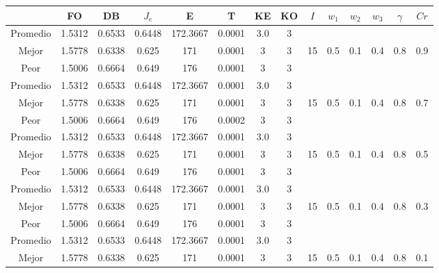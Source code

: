 \begin{table}[h!]
    \footnotesize
    \begin{center}
        \begin{tabular}{|c|c|c|c|c|c|c|c|c|c|c|c|c|c|}
        \hline
            & {\bf FO} & {\bf DB} & $J_e$ & {\bf E} & {\bf T} & {\bf KE} & {\bf KO} & $I$ & $w_1$ & $w_2$ & $w_3$ & $\gamma$ & $Cr$ \\
        \hline
        \hline
            Promedio  & 1.5312 & 0.6533 & 0.6448 & 172.3667 & 0.0001 & 3.0 & 3 &  &  &  &  &  & \\
            \cline{1-8}
            Mejor & 1.5778 & 0.6338  & 0.625 & 171 & 0.0001 & 3 & 3 & 15 & 0.5 & 0.1 & 0.4 & 0.8 & 0.9\\
            \cline{1-8}
            Peor & 1.5006 & 0.6664  & 0.649 & 176 & 0.0001 & 3 & 3 &  &  &  &  &  & \\
        \hline
        \hline
            Promedio  & 1.5312 & 0.6533 & 0.6448 & 172.3667 & 0.0001 & 3.0 & 3 &  &  &  &  &  & \\
            \cline{1-8}
            Mejor & 1.5778 & 0.6338  & 0.625 & 171 & 0.0001 & 3 & 3 & 15 & 0.5 & 0.1 & 0.4 & 0.8 & 0.7\\
            \cline{1-8}
            Peor & 1.5006 & 0.6664  & 0.649 & 176 & 0.0002 & 3 & 3 &  &  &  &  &  & \\
        \hline
        \hline
            Promedio  & 1.5312 & 0.6533 & 0.6448 & 172.3667 & 0.0001 & 3.0 & 3 &  &  &  &  &  & \\
            \cline{1-8}
            Mejor & 1.5778 & 0.6338  & 0.625 & 171 & 0.0001 & 3 & 3 & 15 & 0.5 & 0.1 & 0.4 & 0.8 & 0.5\\
            \cline{1-8}
            Peor & 1.5006 & 0.6664  & 0.649 & 176 & 0.0001 & 3 & 3 &  &  &  &  &  & \\
        \hline
        \hline
            Promedio  & 1.5312 & 0.6533 & 0.6448 & 172.3667 & 0.0001 & 3.0 & 3 &  &  &  &  &  & \\
            \cline{1-8}
            Mejor & 1.5778 & 0.6338  & 0.625 & 171 & 0.0001 & 3 & 3 & 15 & 0.5 & 0.1 & 0.4 & 0.8 & 0.3\\
            \cline{1-8}
            Peor & 1.5006 & 0.6664  & 0.649 & 176 & 0.0001 & 3 & 3 &  &  &  &  &  & \\
        \hline
        \hline
            Promedio  & 1.5312 & 0.6533 & 0.6448 & 172.3667 & 0.0001 & 3.0 & 3 &  &  &  &  &  & \\
            \cline{1-8}
            Mejor & 1.5778 & 0.6338  & 0.625 & 171 & 0.0001 & 3 & 3 & 15 & 0.5 & 0.1 & 0.4 & 0.8 & 0.1\\

\end{tabular}
\end{center}
\end{table}
